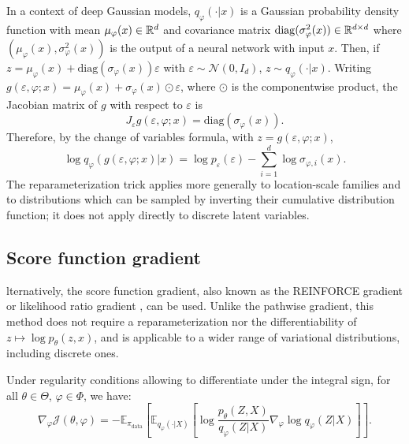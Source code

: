 \documentclass[english,graybox,envcountchap,envcountsame,sectrefs,shortlabels]{svmono}
\theoremstyle{style}
\newcommand{\eqsp}{}
\begin{document}
\begin{example}
In a context of deep Gaussian models, $q_{\varphi}(\cdot|x)$ is a Gaussian probability density function with mean $\mu_{\varphi}(x)\in\mathbb{R}^d$ and covariance matrix $\mathrm{diag}(\sigma_{\varphi}^2(x))\in\mathbb{R}^{d\times d}$ where $(\mu_{\varphi}(x),\sigma_{\varphi}^2(x))$ is the output of a neural network with input $x$. Then, if $z = \mu_{\varphi}(x) + \mathrm{diag}(\sigma_{\varphi}(x))\varepsilon$ with $\varepsilon \sim \mathcal{N}(0,I_d)$, $z\sim q_{\varphi}(\cdot|x)$. Writing $g(\varepsilon, \varphi;x) = \mu_{\varphi}(x) + \sigma_{\varphi}(x)\odot\varepsilon$, where $\odot$ is the componentwise product, the Jacobian matrix of $g$ with respect to $\varepsilon$ is
$$
J_\varepsilon g(\varepsilon, \varphi;x) = \mathrm{diag}(\sigma_{\varphi}(x))\eqsp.
$$
Therefore, by the change of variables formula, with $z=g(\varepsilon, \varphi;x)$,
$$
\log q_{\varphi}(g(\varepsilon, \varphi;x) | x) = \log p_\varepsilon(\varepsilon) - \sum_{i=1}^{d}\log \sigma_{\varphi,i}(x)\eqsp.
$$
The reparameterization trick applies more generally to location-scale families and to distributions which can be sampled by inverting their cumulative distribution function; it does not apply directly to discrete latent variables.
\end{example}

\subsection{Score function gradient}
lternatively, the score function gradient, also known as the REINFORCE gradient or likelihood ratio gradient \cite{glynn1990likelihood,williams1992simple,paisley2012variational}, can be used. Unlike the pathwise gradient, this method does not require a reparameterization nor the differentiability of $z\mapsto\log p_\theta(z,x)$, and is applicable to a wider range of variational distributions, including discrete ones.
\begin{proposition}\label{prop:score_estimator}
Under regularity conditions allowing to differentiate under the integral sign, for all $\theta \in \Theta$, $\varphi \in \Phi$, we have:
$$
\nabla^{}_{\varphi} \mathcal{J}(\theta, \varphi) = -\mathbb{E}_{\pi_{\mathrm{data}}}\left[ \mathbb{E}_{q_{\varphi}(\cdot|X)}\left[ \log \frac{p_{\theta}(Z,X)}{q_{\varphi}(Z | X)} \nabla_{\varphi} \log q_{\varphi}(Z | X) \right] \right]\eqsp.
$$
\end{proposition}
\end{document}

